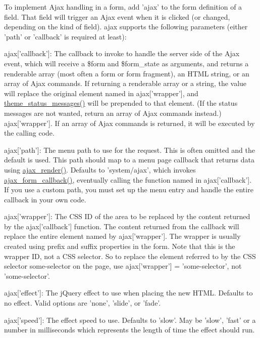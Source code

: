 To implement Ajax handling in a form, add 'ajax' to the form definition of a field. That field will trigger an Ajax event when it is clicked (or changed, depending on the kind of field). ajax supports the following parameters (either 'path' or 'callback' is required at least):
\begin{DoxyItemize}
\item ajax\mbox{[}'callback'\mbox{]}: The callback to invoke to handle the server side of the Ajax event, which will receive a \$form and \$form\_\-state as arguments, and returns a renderable array (most often a form or form fragment), an HTML string, or an array of Ajax commands. If returning a renderable array or a string, the value will replace the original element named in ajax\mbox{[}'wrapper'\mbox{]}, and \hyperlink{group__themeable_gad29a18ad4d19a5fc0a3c75a8804f0331}{theme\_\-status\_\-messages()} will be prepended to that element. (If the status messages are not wanted, return an array of Ajax commands instead.) ajax\mbox{[}'wrapper'\mbox{]}. If an array of Ajax commands is returned, it will be executed by the calling code.
\item ajax\mbox{[}'path'\mbox{]}: The menu path to use for the request. This is often omitted and the default is used. This path should map to a menu page callback that returns data using \hyperlink{group__ajax_ga241c2426bdde049c55b05b7bf5d714a2}{ajax\_\-render()}. Defaults to 'system/ajax', which invokes \hyperlink{group__ajax_gabe2739824006df057d291f6be49759ab}{ajax\_\-form\_\-callback()}, eventually calling the function named in ajax\mbox{[}'callback'\mbox{]}. If you use a custom path, you must set up the menu entry and handle the entire callback in your own code.
\item ajax\mbox{[}'wrapper'\mbox{]}: The CSS ID of the area to be replaced by the content returned by the ajax\mbox{[}'callback'\mbox{]} function. The content returned from the callback will replace the entire element named by ajax\mbox{[}'wrapper'\mbox{]}. The wrapper is usually created using prefix and suffix properties in the form. Note that this is the wrapper ID, not a CSS selector. So to replace the element referred to by the CSS selector some-\/selector on the page, use ajax\mbox{[}'wrapper'\mbox{]} = 'some-\/selector', not 'some-\/selector'.
\item ajax\mbox{[}'effect'\mbox{]}: The jQuery effect to use when placing the new HTML. Defaults to no effect. Valid options are 'none', 'slide', or 'fade'.
\item ajax\mbox{[}'speed'\mbox{]}: The effect speed to use. Defaults to 'slow'. May be 'slow', 'fast' or a number in milliseconds which represents the length of time the effect should run.

\end{DoxyItemize}
